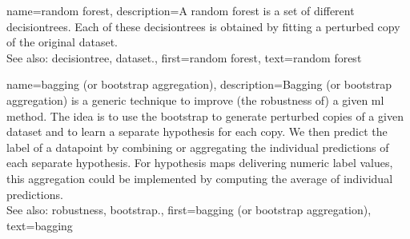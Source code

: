 {name={random forest},
	description={A random forest is a set of different \glspl{decisiontree}. 
		Each of these \glspl{decisiontree} is obtained by fitting a perturbed copy of 
		the original \gls{dataset}.
				\\
		See also: \gls{decisiontree}, \gls{dataset}.},
	first={random forest}, 
	text={random forest}
}

{name={bagging (or bootstrap aggregation)},
	description={Bagging (or bootstrap aggregation) 
		is a generic technique to improve (the \gls{robustness} of) a given \gls{ml} method. 
		The idea is to use the \gls{bootstrap} to generate perturbed copies of a given \gls{dataset}   
		and to learn a separate \gls{hypothesis} for each copy. We then predict the 
		\gls{label} of a \gls{datapoint} by combining or aggregating the individual \glspl{prediction} 
		of each separate \gls{hypothesis}. For \gls{hypothesis} \glspl{map} delivering numeric \gls{label} 
		values, this aggregation could be implemented by computing the average of individual 
		\glspl{prediction}.
				\\
		See also: \gls{robustness}, \gls{bootstrap}.},
	first={bagging (or bootstrap aggregation)},
	text={bagging}
}


